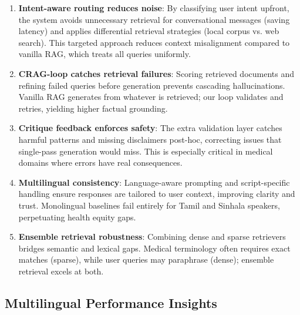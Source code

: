 \documentclass[11pt,a4paper]{article}
\begin{document}
\begin{enumerate}
    \item \textbf{Intent-aware routing reduces noise}: By classifying user intent upfront, the system avoids unnecessary retrieval for conversational messages (saving latency) and applies differential retrieval strategies (local corpus vs. web search). This targeted approach reduces context misalignment compared to vanilla RAG, which treats all queries uniformly.
    
    \item \textbf{CRAG-loop catches retrieval failures}: Scoring retrieved documents and refining failed queries before generation prevents cascading hallucinations. Vanilla RAG generates from whatever is retrieved; our loop validates and retries, yielding higher factual grounding.
    
    \item \textbf{Critique feedback enforces safety}: The extra validation layer catches harmful patterns and missing disclaimers post-hoc, correcting issues that single-pass generation would miss. This is especially critical in medical domains where errors have real consequences.
    
    \item \textbf{Multilingual consistency}: Language-aware prompting and script-specific handling ensure responses are tailored to user context, improving clarity and trust. Monolingual baselines fail entirely for Tamil and Sinhala speakers, perpetuating health equity gaps.
    
    \item \textbf{Ensemble retrieval robustness}: Combining dense and sparse retrievers bridges semantic and lexical gaps. Medical terminology often requires exact matches (sparse), while user queries may paraphrase (dense); ensemble retrieval excels at both.
\end{enumerate}

\subsection{Multilingual Performance Insights}
\label{sec:discussion-multilingual}
\end{document}

